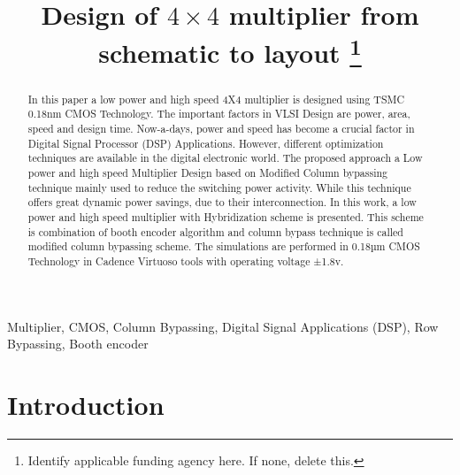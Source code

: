 \documentclass[conference]{IEEEtran}
\begin{document}
\title{Design of $4\times 4$ multiplier from schematic to layout
\thanks{Identify applicable funding agency here. If none, delete this.}
}

\author{
\and
{}
}

\maketitle

\begin{abstract}
    In this paper a low power and high speed 4X4 multiplier is designed using TSMC 0.18nm CMOS Technology. The important factors in VLSI Design are power, area, speed and design time. Now-a-days, power and speed has become a crucial factor in Digital Signal Processor (DSP) Applications. However, different optimization techniques are available in the digital electronic world. The proposed approach a Low power and high speed Multiplier Design based on Modified Column bypassing technique mainly used to reduce the switching power activity. While this technique offers great dynamic power savings, due to their interconnection. In this work, a low power and high speed multiplier with Hybridization scheme is presented. This scheme is combination of booth encoder algorithm and column bypass technique is called modified column bypassing scheme. The simulations are performed in 0.18µm CMOS Technology in Cadence Virtuoso tools with operating voltage ±1.8v.
\end{abstract}

\begin{IEEEkeywords}
    Multiplier, CMOS, Column Bypassing, Digital Signal Applications (DSP), Row Bypassing, Booth encoder
\end{IEEEkeywords}

\section{Introduction}
\end{document}
